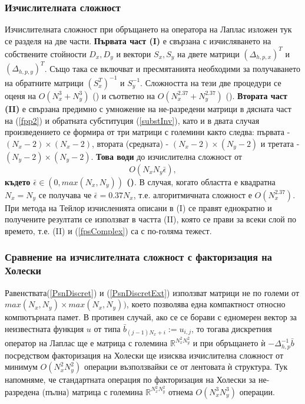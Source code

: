 \documentclass{article}
\newcommand{\be}{\begin{equation}}
\newcommand{\ee}{\end{equation}}
\newcommand{\rf}[1]{(\ref{#1})}
\newcommand{\RR}{\mathbb{R}}
\theoremstyle{remark}
\begin{document}
\subsubsection{Изчислителната сложност}
Изчислителната сложност при обръщането на оператора на Лаплас изложен тук се разделя на две части. \textbf{ Първата част (I)} е свързана с изчисляването на собствените стойности $D_x, D_y$ и вектори $S_x, S_y$ на двете матрици $(\Delta_{h,p,x})^T$ и $(\Delta_{h,p,y})^T$. Също така се включват и пресмятанията необходими за получаването на обратните матрици $(S_x^T)^{-1}$ и $S_y^{-1}$. Сложността на тези две процедури се оценя на $O(N_x^3+N_y^3)$ (\cite{ref260}) и съответно на $O(N_x^{2.37}+N_y^{2.37})$ (\cite{ref27}). \textbf{Втората част (II)} е свързана предимно с умножение на не-разредени матрици в дясната част на \rf{fpp2} и обратната субституция \rf{substInv}, като и в двата случая произведението се формира от три матрици  с големини както следва: първата - $(N_x-2) \times (N_x-2)$, втората (средната) - $(N_x-2) \times (N_y-2)$ и третата - $(N_y-2) \times (N_y-2)$. \textbf{Това води} до изчислителна сложност от 
\be\label{fpsComplex}
O(N_x N_y \bar{\epsilon}),
\ee
\textbf{където $\bar{\epsilon} \in (0, max(N_x, N_y))$ (\cite{ref26, ref27})}. В случая, когато областта е квадратна $N_x = N_y$ се получава че $\bar{\epsilon} = 0.37 N_x$, т.е. алгоритмичната сложност е $O(N_x^{2.37})$. При метода на Тейлор изчисленията описани в (I) се правят еднократно и получените резултати се използват в частта (II), която се прави за всеки слой по времето, т.е. (II) и \rf{fpsComplex} са с по-голяма тежест. 

\subsubsection{Сравнение на изчислителната сложност с факторизация на Холески}
Равенствата\rf{PsnDiscret} и \rf{PsnDiscretExt} използват матрици не по големи от $max(N_x, N_y) \times max(N_x, N_y))$, което позволява една компактност относно компютърната памет. В противен случай, ако се се борави с едномерен вектор за неизвестната функция $u$ от типа $\bar {b}_{(j-1)N_x + i} := u_{i,j}$, то тогава дискретния оператор на Лаплас ще е матрица с големина $\RR^{N_x^2 N_y^2}$ и при обръщането ѝ $-\Delta_{h,p}^{-1}\bar {b}$ посредством факторизация на Холески ще изисква изчислителна сложност от минимум $O(N_x^2 N_y^2)$ операции възползвайки се от лентовата ѝ структура. Тук напомняме, че стандартната операция по факторизация на Холески за не-разредена (пълна) матрица с големина $\RR^{N_x^2 N_y^2}$ отнема $O(N_x^3 N_y^3)$ операции.
\end{document}
